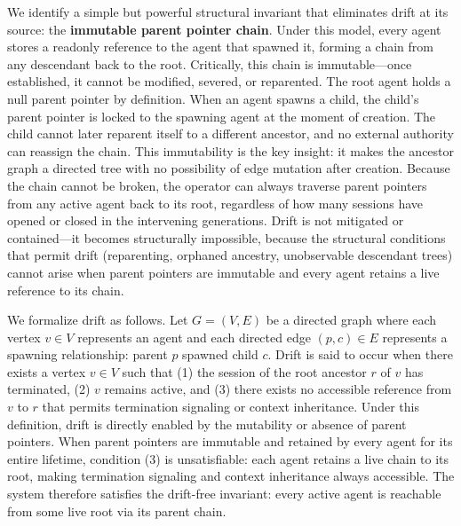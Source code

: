 We identify a simple but powerful structural invariant that eliminates drift at its source: the \textbf{immutable parent pointer chain}. Under this model, every agent stores a readonly reference to the agent that spawned it, forming a chain from any descendant back to the root. Critically, this chain is immutable—once established, it cannot be modified, severed, or reparented. The root agent holds a null parent pointer by definition. When an agent spawns a child, the child's parent pointer is locked to the spawning agent at the moment of creation. The child cannot later reparent itself to a different ancestor, and no external authority can reassign the chain. This immutability is the key insight: it makes the ancestor graph a directed tree with no possibility of edge mutation after creation. Because the chain cannot be broken, the operator can always traverse parent pointers from any active agent back to its root, regardless of how many sessions have opened or closed in the intervening generations. Drift is not mitigated or contained—it becomes structurally impossible, because the structural conditions that permit drift (reparenting, orphaned ancestry, unobservable descendant trees) cannot arise when parent pointers are immutable and every agent retains a live reference to its chain.

We formalize drift as follows. Let $G = (V, E)$ be a directed graph where each vertex $v \in V$ represents an agent and each directed edge $(p, c) \in E$ represents a spawning relationship: parent $p$ spawned child $c$. Drift is said to occur when there exists a vertex $v \in V$ such that (1) the session of the root ancestor $r$ of $v$ has terminated, (2) $v$ remains active, and (3) there exists no accessible reference from $v$ to $r$ that permits termination signaling or context inheritance. Under this definition, drift is directly enabled by the mutability or absence of parent pointers. When parent pointers are immutable and retained by every agent for its entire lifetime, condition (3) is unsatisfiable: each agent retains a live chain to its root, making termination signaling and context inheritance always accessible. The system therefore satisfies the drift-free invariant: every active agent is reachable from some live root via its parent chain.

